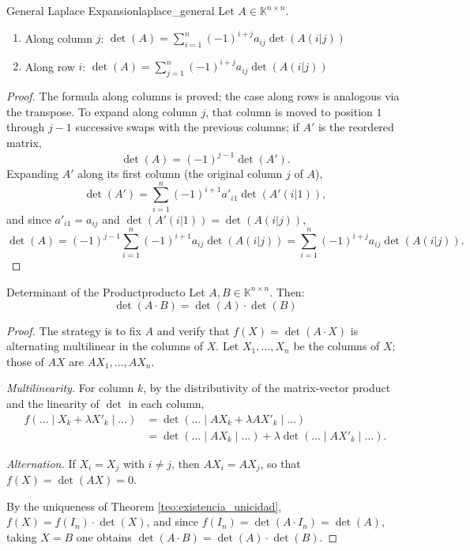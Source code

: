 \documentclass[11pt, a4paper]{article}
\begin{document}
\begin{proposicion}{General Laplace Expansion}{laplace_general}
Let $A \in \mathbb{K}^{n \times n}$.
\begin{enumerate}
    \item Along column $j$: $\det(A) = \sum_{i=1}^n (-1)^{i+j} a_{ij} \det(A(i|j))$
    \item Along row $i$: $\det(A) = \sum_{j=1}^n (-1)^{i+j} a_{ij} \det(A(i|j))$
\end{enumerate}
\end{proposicion}

\begin{proof}
The formula along columns is proved; the case along rows is analogous via the transpose. To expand along column $j$, that column is moved to position $1$ through $j-1$ successive swaps with the previous columns; if $A'$ is the reordered matrix,
\[ \det(A) = (-1)^{j-1} \det(A'). \]
Expanding $A'$ along its first column (the original column $j$ of $A$),
\[ \det(A') = \sum_{i=1}^n (-1)^{i+1} a'_{i1} \det(A'(i|1)), \]
and since $a'_{i1} = a_{ij}$ and $\det(A'(i|1)) = \det(A(i|j))$,
\[
\det(A) = (-1)^{j-1} \sum_{i=1}^n (-1)^{i+1} a_{ij} \det(A(i|j)) = \sum_{i=1}^n (-1)^{i+j} a_{ij} \det(A(i|j)).
\]
\end{proof}

\begin{proposicion}{Determinant of the Product}{producto}
Let $A, B \in \mathbb{K}^{n \times n}$. Then:
\[ \det(A \cdot B) = \det(A) \cdot \det(B) \]
\end{proposicion}

\begin{proof}
The strategy is to fix $A$ and verify that $f(X) = \det(A \cdot X)$ is alternating multilinear in the columns of $X$. Let $X_1, \dots, X_n$ be the columns of $X$; those of $AX$ are $AX_1, \dots, AX_n$.

\textit{Multilinearity.} For column $k$, by the distributivity of the matrix-vector product and the linearity of $\det$ in each column,
\begin{align*}
f(\dots \mid X_k + \lambda X'_k \mid \dots) &= \det(\dots \mid AX_k + \lambda AX'_k \mid \dots) \\
&= \det(\dots \mid AX_k \mid \dots) + \lambda \det(\dots \mid AX'_k \mid \dots).
\end{align*}

\textit{Alternation.} If $X_i = X_j$ with $i \neq j$, then $AX_i = AX_j$, so that $f(X) = \det(AX) = 0$.

By the uniqueness of Theorem \ref{teo:existencia_unicidad}, $f(X) = f(I_n) \cdot \det(X)$, and since $f(I_n) = \det(A \cdot I_n) = \det(A)$, taking $X = B$ one obtains $\det(A \cdot B) = \det(A) \cdot \det(B)$.
\end{proof}
\end{document}
